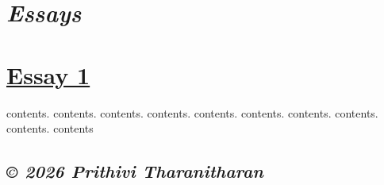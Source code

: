 \documentclass[12pt]{article}
\begin{document}
\section*{\textit{Essays}}

\section*{\href{/home/}{Essay 1}}
contents. contents. contents. contents. contents. contents. contents. contents. contents. contents

\subsection*{\textit{© 2026 Prithivi Tharanitharan}}
\end{document}
